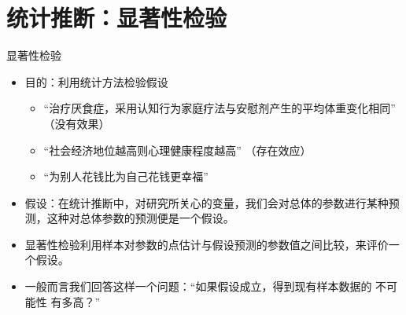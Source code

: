 \documentclass[presentation]{beamer}
\begin{document}
\section{统计推断：显著性检验}
\label{sec:org2dfb244}
\begin{frame}[label={sec:orga20f435}]{显著性检验}
\begin{itemize}
\item 目的：利用统计方法检验假设

\begin{itemize}
\item “治疗厌食症，采用认知行为家庭疗法与安慰剂产生的平均体重变化相同”  （没有效果）

\item “社会经济地位越高则心理健康程度越高”  （存在效应）

\item “为别人花钱比为自己花钱更幸福”
\end{itemize}

\item 假设：在统计推断中，对研究所关心的变量，我们会对总体的参数进行某种预测，这种对总体参数的预测便是一个假设。

\item 显著性检验利用样本对参数的点估计与假设预测的参数值之间比较，来评价一个假设。

\item 一般而言我们回答这样一个问题：“如果假设成立，得到现有样本数据的 \alert{不可能性} 有多高？”
\end{itemize}
\end{frame}
\end{document}
